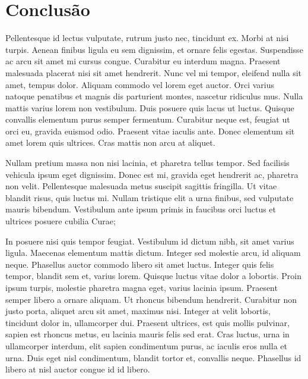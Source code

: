 \section{Conclusão}


Pellentesque id lectus vulputate, rutrum justo nec, tincidunt ex. Morbi at nisi turpis. Aenean finibus ligula eu sem dignissim, et ornare felis egestas. Suspendisse ac arcu sit amet mi cursus congue. Curabitur eu interdum magna. Praesent malesuada placerat nisi sit amet hendrerit. Nunc vel mi tempor, eleifend nulla sit amet, tempus dolor. Aliquam commodo vel lorem eget auctor. Orci varius natoque penatibus et magnis dis parturient montes, nascetur ridiculus mus. Nulla mattis varius lorem non vestibulum. Duis posuere quis lacus ut luctus. Quisque convallis elementum purus semper fermentum. Curabitur neque est, feugiat ut orci eu, gravida euismod odio. Praesent vitae iaculis ante. Donec elementum sit amet lorem quis ultrices. Cras mattis non arcu at aliquet.

Nullam pretium massa non nisi lacinia, et pharetra tellus tempor. Sed facilisis vehicula ipsum eget dignissim. Donec est mi, gravida eget hendrerit ac, pharetra non velit. Pellentesque malesuada metus suscipit sagittis fringilla. Ut vitae blandit risus, quis luctus mi. Nullam tristique elit a urna finibus, sed vulputate mauris bibendum. Vestibulum ante ipsum primis in faucibus orci luctus et ultrices posuere cubilia Curae;

In posuere nisi quis tempor feugiat. Vestibulum id dictum nibh, sit amet varius ligula. Maecenas elementum mattis dictum. Integer sed molestie arcu, id aliquam neque. Phasellus auctor commodo libero sit amet luctus. Integer quis felis tempor, blandit sem et, varius lorem. Quisque luctus vitae dolor a lobortis. Proin ipsum turpis, molestie pharetra magna eget, varius lacinia ipsum. Praesent semper libero a ornare aliquam. Ut rhoncus bibendum hendrerit. Curabitur non justo porta, aliquet arcu sit amet, maximus nisi. Integer at velit lobortis, tincidunt dolor in, ullamcorper dui. Praesent ultrices, est quis mollis pulvinar, sapien est rhoncus metus, eu lacinia mauris felis sed erat. Cras luctus, urna in ullamcorper interdum, elit sapien condimentum purus, ac iaculis eros nulla et urna. Duis eget nisl condimentum, blandit tortor et, convallis neque. Phasellus id libero at nisl auctor congue id id libero. 
